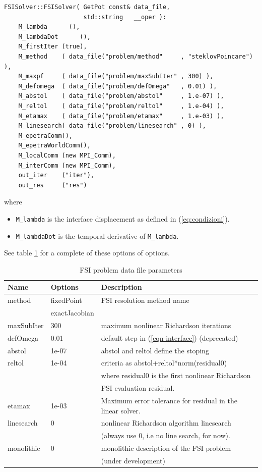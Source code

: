 \begin{verbatim}
FSISolver::FSISolver( GetPot const& data_file,
                      std::string   __oper ):
    M_lambda      (),
    M_lambdaDot      (),
    M_firstIter (true),
    M_method    ( data_file("problem/method"     , "steklovPoincare") ),
    M_maxpf     ( data_file("problem/maxSubIter" , 300) ),
    M_defomega  ( data_file("problem/defOmega"   , 0.01) ),
    M_abstol    ( data_file("problem/abstol"     , 1.e-07) ),
    M_reltol    ( data_file("problem/reltol"     , 1.e-04) ),
    M_etamax    ( data_file("problem/etamax"     , 1.e-03) ),
    M_linesearch( data_file("problem/linesearch" , 0) ),
    M_epetraComm(),
    M_epetraWorldComm(),
    M_localComm (new MPI_Comm),
    M_interComm (new MPI_Comm),
    out_iter    ("iter"),
    out_res     ("res")
\end{verbatim}


where
\begin{itemize}
\item \verb!M_lambda! is the interface displacement as defined in (\ref{eq:condizioni}).
\item \verb!M_lambdaDot! is the temporal derivative of \verb!M_lambda!.
\end{itemize}
See table \ref{table-fsiparams} for a complete of these options of options.

\begin{table}[!h]
\begin{center}
\begin{tabular}{|l|l|l|}
\hline
Name & Options & Description \\
\hline \hline
method & fixedPoint & FSI resolution method name\\
& exactJacobian & \\
\hline
maxSubIter & 300 & maximum nonlinear Richardson iterations \\
\hline
defOmega & 0.01 & default step in (\ref{eqn-interface}) (deprecated) \\
\hline
abstol & 1e-07 & abstol and reltol define the stoping \\
reltol & 1e-04 & criteria as abstol+reltol*norm(residual0) \\
& & where residual0 is the first nonlinear Richardson \\
& & FSI evaluation residual. \\
\hline
etamax & 1e-03 &  Maximum error tolerance for residual in the linear solver. \\
\hline
linesearch & 0 & nonlinear Richardson algorithm linesearch \\
& & (always use 0, i.e no line search, for now).\\
monolithic & 0 & monolithic description of the FSI problem \\
& & (under development)\\
\hline

\end{tabular}
\end{center}
\caption{ FSI problem data file parameters
}
\label{table-fsiparams}
\end{table}


